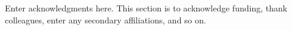 \documentclass[draft]{agujournal2019}
\begin{document}
\acknowledgments
Enter acknowledgments here. This section is to acknowledge funding, thank colleagues, enter any secondary affiliations, and so on.




%
%





%
%
%
%
%
\end{document}
